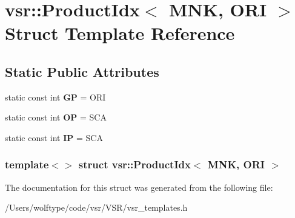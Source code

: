 \hypertarget{structvsr_1_1_product_idx_3_01_m_n_k_00_01_o_r_i_01_4}{\section{vsr\-:\-:Product\-Idx$<$ M\-N\-K, O\-R\-I $>$ Struct Template Reference}
\label{structvsr_1_1_product_idx_3_01_m_n_k_00_01_o_r_i_01_4}
}
\subsection*{Static Public Attributes}
\begin{DoxyCompactItemize}
\item 
\hypertarget{structvsr_1_1_product_idx_3_01_m_n_k_00_01_o_r_i_01_4_a652a06b95af18c26bec69ccc8e5c6a0d}{static const int {\bfseries G\-P} = O\-R\-I}\label{structvsr_1_1_product_idx_3_01_m_n_k_00_01_o_r_i_01_4_a652a06b95af18c26bec69ccc8e5c6a0d}

\item 
\hypertarget{structvsr_1_1_product_idx_3_01_m_n_k_00_01_o_r_i_01_4_ae897b7fe296f97323807e86a89f1ade7}{static const int {\bfseries O\-P} = S\-C\-A}\label{structvsr_1_1_product_idx_3_01_m_n_k_00_01_o_r_i_01_4_ae897b7fe296f97323807e86a89f1ade7}

\item 
\hypertarget{structvsr_1_1_product_idx_3_01_m_n_k_00_01_o_r_i_01_4_a642d44be53a0b5b56846ba8361cb6d4f}{static const int {\bfseries I\-P} = S\-C\-A}\label{structvsr_1_1_product_idx_3_01_m_n_k_00_01_o_r_i_01_4_a642d44be53a0b5b56846ba8361cb6d4f}

\end{DoxyCompactItemize}
\subsubsection*{template$<$$>$ struct vsr\-::\-Product\-Idx$<$ M\-N\-K, O\-R\-I $>$}



The documentation for this struct was generated from the following file\-:\begin{DoxyCompactItemize}
\item 
/\-Users/wolftype/code/vsr/\-V\-S\-R/vsr\-\_\-templates.\-h\end{DoxyCompactItemize}
